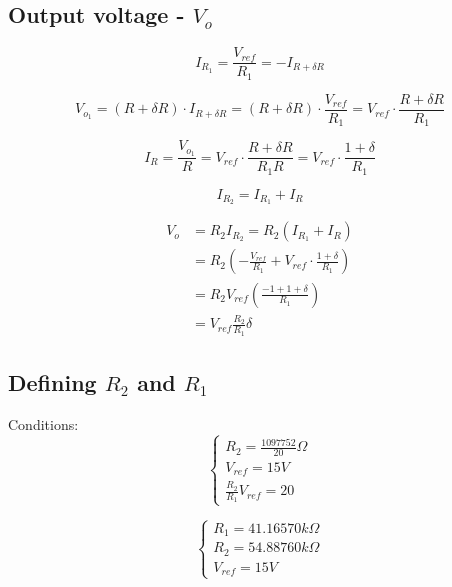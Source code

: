 \documentclass[10pt,a4paper]{article}
\begin{document}
\subsection{Output voltage - $V_o$}

\begin{equation} \label{I_R1}
  I_{R_1} = \frac{V_{ref}}{R_1} = - I_{R+\delta R}
\end{equation}

\begin{equation} \label{V_o1}
  V_{o_1} = (R+\delta R) \cdot I_{R+\delta R}
  = (R+\delta R) \cdot \frac{V_{ref}}{R_1}
  = V_{ref} \cdot \frac{R+\delta R}{R_1}
\end{equation}

\begin{equation} \label{I_R}
  I_R = \frac{V_{o_1}}{R} = V_{ref} \cdot \frac{R+\delta R}{R_1R}
  = V_{ref} \cdot \frac{1+\delta}{R_1}
\end{equation}

\begin{equation} \label{I_R2}
  I_{R_2} = I_{R_1} + I_R
\end{equation}

\begin{align}
  V_o &= R_2 I_{R_2} = R_2 (I_{R_1} + I_R) \nonumber \\
  &= R_2 \left(- \frac{V_{ref}}{R_1} + V_{ref} \cdot \frac{1+\delta}{R_1} \right) \nonumber \\ 
  &= R_2 V_{ref} \left( \frac{-1+1+\delta}{R_1} \right) \nonumber \\
  &= V_{ref}\frac{R_2}{R_1}\delta \label{V_o}
\end{align}

\subsection{Defining $R_2$ and $R_1$}
Conditions:
\begin{equation} \label{eq:conditions3}
  \left\{
    \begin{array}{l}
      R_2 = \frac{1097752}{20}\Omega \\
      V_{ref} = 15V \\
      \frac{R_2}{R_1}V_{ref} = 20
    \end{array}
  \right.
\end{equation}

\begin{equation} \label{eq:R2R1_3}
  \left\{
    \begin{array}{l}
      R_1 = 41.16570k\Omega \\
      R_2 = 54.88760k\Omega \\
      V_{ref} = 15V
    \end{array}
  \right.
\end{equation}
\end{document}
